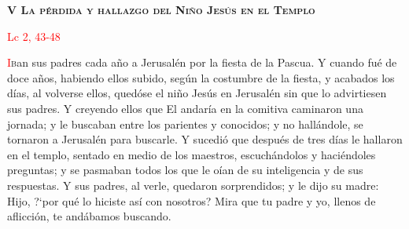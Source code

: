 \begin{center}
    \textbf{\textsc{V La pérdida y hallazgo del Niño Jesús en el Templo}}
    
    \textcolor{red}{Lc 2, 43-48}
\end{center}

\vspace{0.25em}

\lettrine[lines=2]{\textcolor{red}{I}}ban sus padres cada año a Jerusalén por la fiesta de la Pascua. Y cuando fué de doce años, habiendo ellos subido, según la costumbre de la fiesta,
y acabados los días, al volverse ellos, quedóse el niño Jesús en Jerusalén sin que lo advirtiesen sus padres. Y creyendo ellos que El andaría en la comitiva caminaron una jornada; y le
buscaban entre los parientes y conocidos; y no hallándole, se tornaron a Jerusalén para buscarle. Y sucedió que después de tres días le hallaron en el templo,
sentado en medio de los maestros, escuchándolos y haciéndoles preguntas; y se pasmaban todos los que le oían de su inteligencia y de sus respuestas.
Y sus padres, al verle, quedaron sorprendidos; y le dijo su madre: Hijo, {?`}por qué lo hiciste así con nosotros? Mira que tu padre y yo, llenos de aflicción, 
te andábamos buscando.